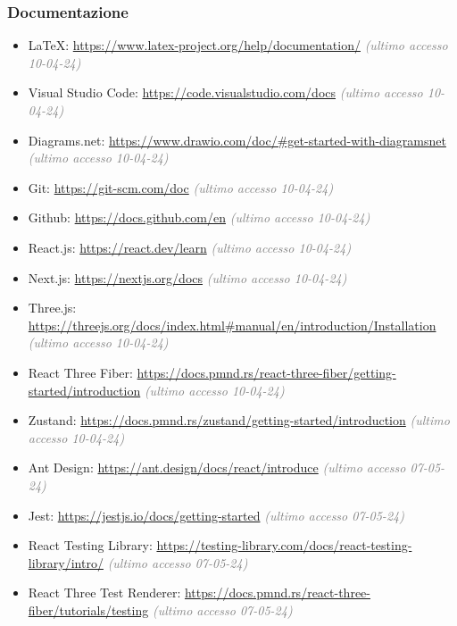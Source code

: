 \subsubsection{Documentazione}
\begin{itemize}
        \item \LaTeX: \url{https://www.latex-project.org/help/documentation/} \textcolor{gray}{\textit{(ultimo accesso 10-04-24)}}
        \item Visual Studio Code: \url{https://code.visualstudio.com/docs} \textcolor{gray}{\textit{(ultimo accesso 10-04-24)}}
        \item Diagrams.net: \url{https://www.drawio.com/doc/#get-started-with-diagramsnet} \textcolor{gray}{\textit{(ultimo accesso 10-04-24)}}
        \item Git: \url{https://git-scm.com/doc} \textcolor{gray}{\textit{(ultimo accesso 10-04-24)}}
        \item Github: \url{https://docs.github.com/en} \textcolor{gray}{\textit{(ultimo accesso 10-04-24)}}
        \item React.js: \url{https://react.dev/learn} \textcolor{gray}{\textit{(ultimo accesso 10-04-24)}}
        \item Next.js: \url{https://nextjs.org/docs} \textcolor{gray}{\textit{(ultimo accesso 10-04-24)}}
        \item Three.js: \url{https://threejs.org/docs/index.html#manual/en/introduction/Installation} \textcolor{gray}{\textit{(ultimo accesso 10-04-24)}}
        \item React Three Fiber: \url{https://docs.pmnd.rs/react-three-fiber/getting-started/introduction} \textcolor{gray}{\textit{(ultimo accesso 10-04-24)}}
        \item Zustand: \url{https://docs.pmnd.rs/zustand/getting-started/introduction} \textcolor{gray}{\textit{(ultimo accesso 10-04-24)}}
        \item Ant Design: \url{https://ant.design/docs/react/introduce} \textcolor{gray}{\textit{(ultimo accesso 07-05-24)}}
        \item Jest: \url{https://jestjs.io/docs/getting-started} \textcolor{gray}{\textit{(ultimo accesso 07-05-24)}}
        \item React Testing Library: \url{https://testing-library.com/docs/react-testing-library/intro/} \textcolor{gray}{\textit{(ultimo accesso 07-05-24)}}
        \item React Three Test Renderer: \url{https://docs.pmnd.rs/react-three-fiber/tutorials/testing} \textcolor{gray}{\textit{(ultimo accesso 07-05-24)}}
    \end{itemize}
